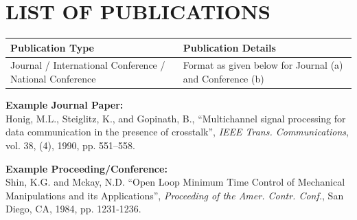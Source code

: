 \chapter*{LIST OF PUBLICATIONS}

\begin{table}[h!]
\centering
\begin{tabular}{|p{4cm}|p{10cm}|}
\hline
\textbf{Publication Type} & \textbf{Publication Details} \\
\hline
Journal / International Conference / National Conference & Format as given below for Journal (a) and Conference (b) \\
\hline
\end{tabular}
\end{table}

\textbf{Example Journal Paper:}\\
Honig, M.L., Steiglitz, K., and Gopinath, B., ``Multichannel signal processing for data communication in the presence of crosstalk'', \textit{IEEE Trans. Communications}, vol. 38, (4), 1990, pp. 551–558.

\vspace{0.5cm}
\textbf{Example Proceeding/Conference:}\\
Shin, K.G. and Mckay, N.D. ``Open Loop Minimum Time Control of Mechanical Manipulations and its Applications'', \textit{Proceeding of the Amer. Contr. Conf.}, San Diego, CA, 1984, pp. 1231-1236.